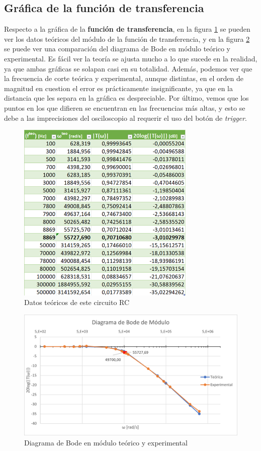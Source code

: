 \subsection{Gráfica de la función de transferencia}
Respecto a la gráfica de la \textbf{función de transferencia}, en la figura \ref{fig:Datos_Teo} se pueden ver los datos teóricos del módulo de la función de transferencia, y en la figura \ref{fig:BodeTeo} se puede ver una comparación del diagrama de Bode en módulo teórico y experimental. Es fácil ver la teoría se ajusta mucho a lo que sucede en la realidad, ya que ambas gráficas se solapan casi en su totalidad. Además, podemos ver que la frecuencia de corte teórica y experimental, aunque distintas, en el orden de magnitud en cuestion el error es prácticamente insignificante, ya que en la distancia que les separa en la gráfica es despreciable. Por último, vemos que los puntos en los que difieren se encuentran en las frecuencias más altas, y esto se debe a las imprecisiones del osciloscopio al requerir el uso del botón de \emph{trigger}.

\begin{figure}
    \centering
    \includegraphics[width=8.5cm]{Imágenes 03/Tabla_Datos_Teo.png}
    \caption{Datos teóricos de este circuito RC}
    \label{fig:Datos_Teo}
\end{figure}

\begin{figure}
    \centering
    \includegraphics[width=13.5cm]{Imágenes 03/Grafico_Teo.png}
    \caption{Diagrama de Bode en módulo teórico y experimental}
    \label{fig:BodeTeo}
\end{figure}


